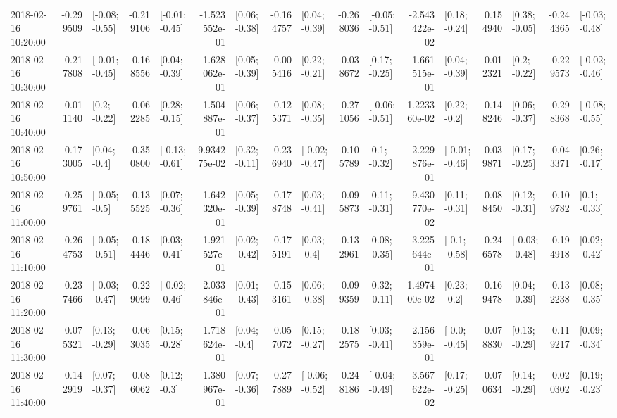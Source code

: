 \begin{tabular}{lrlrlrlrlrlrlrlrl}
2018-02-16 10:20:00 & -0.299509 &  [-0.08; -0.55] & -0.219106 &  [-0.01; -0.45] & -1.523552e-01 &   [0.06; -0.38] & -0.164757 &   [0.04; -0.39] & -0.268036 &  [-0.05; -0.51] & -2.543422e-02 &   [0.18; -0.24] &  0.154940 &   [0.38; -0.05] & -0.244365 &  [-0.03; -0.48] \\
2018-02-16 10:30:00 & -0.217808 &  [-0.01; -0.45] & -0.168556 &   [0.04; -0.39] & -1.628062e-01 &   [0.05; -0.39] &  0.005416 &   [0.22; -0.21] & -0.038672 &   [0.17; -0.25] & -1.661515e-01 &   [0.04; -0.39] & -0.012321 &    [0.2; -0.22] & -0.229573 &  [-0.02; -0.46] \\
2018-02-16 10:40:00 & -0.011140 &    [0.2; -0.22] &  0.062285 &   [0.28; -0.15] & -1.504887e-01 &   [0.06; -0.37] & -0.125371 &   [0.08; -0.35] & -0.271056 &  [-0.06; -0.51] &  1.223360e-02 &    [0.22; -0.2] & -0.148246 &   [0.06; -0.37] & -0.298368 &  [-0.08; -0.55] \\
2018-02-16 10:50:00 & -0.173005 &    [0.04; -0.4] & -0.350800 &  [-0.13; -0.61] &  9.934275e-02 &   [0.32; -0.11] & -0.236940 &  [-0.02; -0.47] & -0.105789 &    [0.1; -0.32] & -2.229876e-01 &  [-0.01; -0.46] & -0.039871 &   [0.17; -0.25] &  0.043371 &   [0.26; -0.17] \\
2018-02-16 11:00:00 & -0.259761 &   [-0.05; -0.5] & -0.135525 &   [0.07; -0.36] & -1.642320e-01 &   [0.05; -0.39] & -0.178748 &   [0.03; -0.41] & -0.095873 &   [0.11; -0.31] & -9.430770e-02 &   [0.11; -0.31] & -0.088450 &   [0.12; -0.31] & -0.109782 &    [0.1; -0.33] \\
2018-02-16 11:10:00 & -0.264753 &  [-0.05; -0.51] & -0.184446 &   [0.03; -0.41] & -1.921527e-01 &   [0.02; -0.42] & -0.175191 &    [0.03; -0.4] & -0.132961 &   [0.08; -0.35] & -3.225644e-01 &   [-0.1; -0.58] & -0.246578 &  [-0.03; -0.48] & -0.194918 &   [0.02; -0.42] \\
2018-02-16 11:20:00 & -0.237466 &  [-0.03; -0.47] & -0.229099 &  [-0.02; -0.46] & -2.033846e-01 &   [0.01; -0.43] & -0.153161 &   [0.06; -0.38] &  0.099359 &   [0.32; -0.11] &  1.497400e-02 &    [0.23; -0.2] & -0.169478 &   [0.04; -0.39] & -0.132238 &   [0.08; -0.35] \\
2018-02-16 11:30:00 & -0.075321 &   [0.13; -0.29] & -0.063035 &   [0.15; -0.28] & -1.718624e-01 &    [0.04; -0.4] & -0.057072 &   [0.15; -0.27] & -0.182575 &   [0.03; -0.41] & -2.156359e-01 &   [-0.0; -0.45] & -0.078830 &   [0.13; -0.29] & -0.119217 &   [0.09; -0.34] \\
2018-02-16 11:40:00 & -0.142919 &   [0.07; -0.37] & -0.086062 &    [0.12; -0.3] & -1.380967e-01 &   [0.07; -0.36] & -0.277889 &  [-0.06; -0.52] & -0.248186 &  [-0.04; -0.49] & -3.567622e-02 &   [0.17; -0.25] & -0.070634 &   [0.14; -0.29] & -0.020302 &   [0.19; -0.23] \\

\end{tabular}
